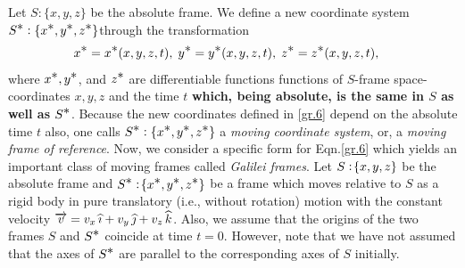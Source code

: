 Let $S:\{x,y,z\}$ be the absolute frame. We define a 
new coordinate system $S^{\textstyle \ast}:\{x^{\textstyle \ast}, y^{\textstyle \ast}, 
z^{\textstyle \ast}\}$\lbk through the transformation
\begin{align} \label{gr.6}
x^{\textstyle \ast} &= x^{\textstyle \ast} (x,y,z,t), \; y^{\textstyle \ast} = y^{\textstyle \ast}
(x,y,z,t), \; z^{\textstyle \ast} =z^{\textstyle \ast} (x,y,z,t),
\end{align}
where $x^{\textstyle \ast}, y^{\textstyle \ast}$, and $z^{\textstyle \ast}$ are differentiable 
functions functions of $S$-frame space-coordinates $x, 
y, z$ and the time $t$ \textbf{which, being absolute, 
is the same in $S$ as well as $S^{\textstyle \ast}$}. Because the 
new coordinates defined in \eqref{gr.6} depend on the 
absolute time $t$ also, one calls $S^{\textstyle \ast}:\{x^{\textstyle \ast}, 
y^{\textstyle \ast}, z^{\textstyle \ast}\}$ a \textsl{moving coordinate system}, 
 or, a \textsl{moving 
frame of reference}. 
 Now, we consider a 
specific form for Eqn.\eqref{gr.6} which yields an 
important class of moving frames called \textsl{Galilei 
frames}. Let $S : \negthinspace\{x,y,z\}$ be the absolute frame 
and $S^{\textstyle \ast}: \negthinspace \{x^{\textstyle \ast},y^{\textstyle \ast}, z^{\textstyle \ast} \}$ be a frame 
which moves relative to $S$ as a rigid body in pure 
translatory (i.e., without rotation) motion with the 
{constant velocity} $\overrightarrow{v} =v_x\,{\widehat{\imath}} +v_y\,{\widehat{\jmath}} + 
v_z\,{\widehat{k}}$. Also, we assume that  the origins of the 
two frames $S$ and $S^{\textstyle \ast}$ coincide at time $t=0$. 
However, note that we have not assumed that the axes of 
$S^{\textstyle \ast}$ are parallel to the corresponding axes of $S$ 
initially.

